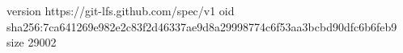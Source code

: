 version https://git-lfs.github.com/spec/v1
oid sha256:7ca641269e982e2c83f2d46337ae9d8a29998774c6f53aa3bcbd90dfc6b6feb9
size 29002
